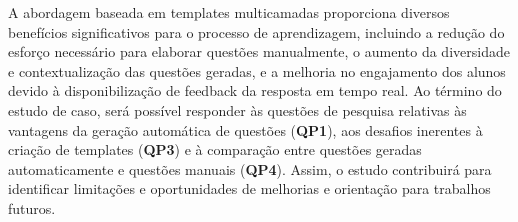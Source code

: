 A abordagem baseada em templates multicamadas proporciona diversos benefícios significativos para o processo de aprendizagem, incluindo a redução do esforço necessário para elaborar questões manualmente, o aumento da diversidade e contextualização das questões geradas, e a melhoria no engajamento dos alunos devido à disponibilização de feedback da resposta em tempo real. 
Ao término do estudo de caso, será possível responder às questões de pesquisa relativas às vantagens da geração automática de questões (\textbf{QP1}), aos desafios inerentes à criação de templates (\textbf{QP3}) e à comparação entre questões geradas automaticamente e questões manuais (\textbf{QP4}). Assim, o estudo contribuirá para identificar limitações e oportunidades de melhorias e orientação para trabalhos futuros.
